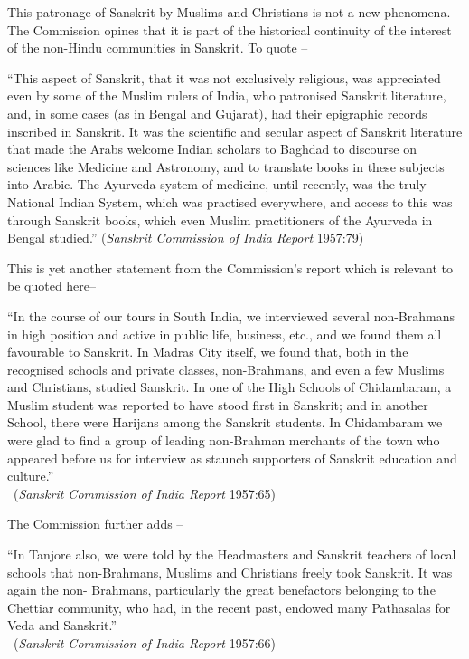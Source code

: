 This patronage of Sanskrit by Muslims and Christians is not a new phenomena. The Commission opines that it is part of the historical continuity of the interest of the non-Hindu communities in Sanskrit. To quote – 
\begin{myquote}
\eleven
“This aspect of Sanskrit, that it was not exclusively religious, was appreciated even by some of the Muslim rulers of India, who patronised Sanskrit literature, and, in some cases (as in Bengal and Gujarat), had their epigraphic records inscribed in Sanskrit. It was the scientific and secular aspect of Sanskrit literature that made the Arabs welcome Indian scholars to Baghdad to discourse on sciences like Medicine and Astronomy, and to translate books in these subjects into Arabic. The Ayurveda system of medicine, until recently, was the truly National Indian System, which was practised everywhere, and access to this was through Sanskrit books, which even Muslim practitioners of the Ayurveda in Bengal studied.”  
({\sl Sanskrit Commission of India Report} 1957:79)
\end{myquote}

This is yet another statement from the Commission’s report which is relevant to be quoted here–
\begin{myquote}
\eleven
“In the course of our tours in South India, we interviewed several non-Brahmans in high position and active in public life, business, etc., and we found them all favourable to Sanskrit. In Madras City itself, we found that, both in the recognised schools and private classes, non-Brahmans, and even a few Muslims and Christians, studied Sanskrit. In one of the High Schools of Chidambaram, a Muslim student was reported to have stood first in Sanskrit; and in another School, there were Harijans among the Sanskrit students. In Chidambaram we were glad to find a group of leading non-Brahman merchants of the town who appeared before us for interview as staunch supporters of Sanskrit education and culture.”\\[-15pt] 

~\hfill({\sl Sanskrit Commission of India Report} 1957:65)
\end{myquote}

The Commission further adds –
\begin{myquote}
\eleven
“In Tanjore also, we were told by the Headmasters and Sanskrit teachers of local schools that non-Brahmans, Muslims and Christians freely took Sanskrit. It was again the non- Brahmans, particularly the great benefactors belonging to the Chettiar community, who had, in the recent past, endowed many Pathasalas for Veda and Sanskrit.”\\[-15pt] 

~\hfill ({\sl Sanskrit Commission of India Report} 1957:66)
\end{myquote}


